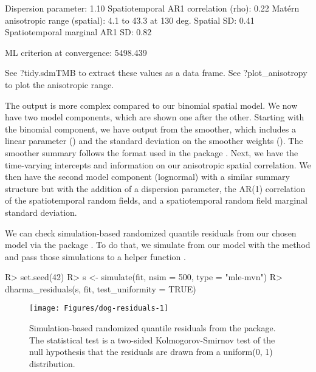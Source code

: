 \documentclass[article]{jss}\usepackage[]{graphicx}\usepackage[dvipsnames]{xcolor}
\newcommand{\fct}[1]{\code{#1()}}
\begin{document}
\begin{Schunk}
\begin{Soutput}
Dispersion parameter: 1.10
Spatiotemporal AR1 correlation (rho): 0.22
Matérn anisotropic range (spatial): 4.1 to 43.3 at 130 deg.
Spatial SD: 0.41
Spatiotemporal marginal AR1 SD: 0.82

ML criterion at convergence: 5498.439

See ?tidy.sdmTMB to extract these values as a data frame.
See ?plot_anisotropy to plot the anisotropic range.
\end{Soutput}
\end{Schunk}

The output is more complex compared to our binomial spatial model.
We now have two model components, which are shown one after the other.
Starting with the binomial component, we have output from the smoother, which includes a linear parameter () and the standard deviation on the smoother weights ().
The smoother summary follows the format used in the  package \citep{brms}.
Next, we have the time-varying intercepts and information on our anisotropic spatial correlation.
We then have the second model component (lognormal) with a similar summary structure but with the addition of a dispersion parameter, the AR(1) correlation of the spatiotemporal random fields, and a spatiotemporal random field marginal standard deviation.

We can check simulation-based randomized quantile residuals from our chosen model via the  package \citep{dharma}.
To do that, we simulate from our model with the \fct{simulate.sdmTMB} method and pass those simulations to a helper function \fct{dharma\_residuals}.

\begin{Schunk}
\begin{Sinput}
R> set.seed(42)
R> s <- simulate(fit, nsim = 500, type = "mle-mvn")
R> dharma_residuals(s, fit, test_uniformity = TRUE)
\end{Sinput}
\begin{figure}[ht]

{\centering \texttt{[image: Figures/dog-residuals-1]} 

}

\caption[Simulation-based randomized quantile residuals from the  package]{Simulation-based randomized quantile residuals from the  package. The statistical test is a two-sided Kolmogorov-Smirnov test of the null hypothesis that the residuals are drawn from a uniform(0, 1) distribution.}\label{fig:dog-residuals}
\end{figure}
\end{Schunk}
\end{document}
